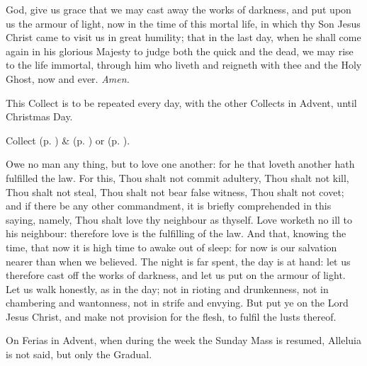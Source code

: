 \collect\label{AdventICollect}
 God, give us grace that we may cast away the works of darkness, and put upon us the armour of light, now in the time of this mortal life, in which thy Son Jesus Christ came to visit us in great humility; that in the last day, when he shall come again in his glorious Majesty to judge both the quick and the dead, we may rise to the life immortal, through him who liveth and reigneth with thee and the Holy Ghost, now and ever. \textit{Amen.}
\begin{rubric}
    This Collect is to be repeated every day, with the other Collects in Advent, until Christmas Day.
\end{rubric}
\begin{rubric}
     Collect  (p. \pageref{SPMaryInAdvent}) \&   (p. \pageref{SPAgainst}) or  (p. \pageref{SPChiefBishop}).
\end{rubric}
 Owe no man any thing, but to love one another: for he that loveth another hath fulfilled the law. For this, Thou shalt not commit adultery, Thou shalt not kill, Thou shalt not steal, Thou shalt not bear false witness, Thou shalt not covet; and if there be any other commandment, it is briefly comprehended in this saying, namely, Thou shalt love thy neighbour as thyself. Love worketh no ill to his neighbour: therefore love is the fulfilling of the law. And that, knowing the time, that now it is high time to awake out of sleep: for now is our salvation nearer than when we believed. The night is far spent, the day is at hand: let us therefore cast off the works of darkness, and let us put on the armour of light. Let us walk honestly, as in the day; not in rioting and drunkenness, not in chambering and wantonness, not in strife and envying. But put ye on the Lord Jesus Christ, and make not provision for the flesh, to fulfil the lusts thereof.
\begin{rubric}
    On Ferias in Advent, when during the week the Sunday Mass is resumed, Alleluia is not said, but only the Gradual.
\end{rubric}

